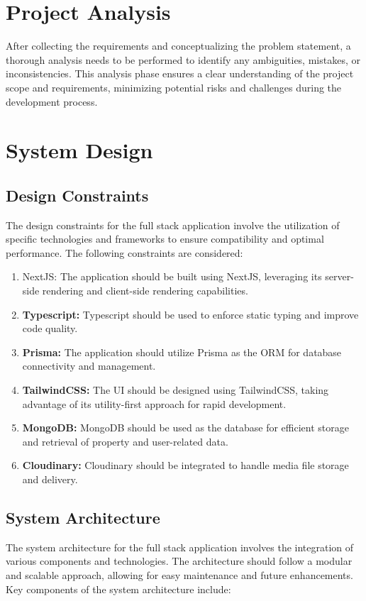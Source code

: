 \section{Project Analysis}
After collecting the requirements and conceptualizing the problem statement, a thorough analysis needs to be performed to identify any ambiguities, mistakes, or inconsistencies. This analysis phase ensures a clear understanding of the project scope and requirements, minimizing potential risks and challenges during the development process.

\section{System Design}
\subsection{Design Constraints}
The design constraints for the full stack application involve the utilization of specific technologies and frameworks to ensure compatibility and optimal performance. The following constraints are considered:
\begin{enumerate}
	\item NextJS: The application should be built using NextJS, leveraging its server-side rendering and client-side rendering capabilities.
	\item \textbf{Typescript:} Typescript should be used to enforce static typing and improve code quality.
	\item \textbf{Prisma:} The application should utilize Prisma as the ORM for database connectivity and management.
	\item \textbf{TailwindCSS:} The UI should be designed using TailwindCSS, taking advantage of its utility-first approach for rapid development.
	\item \textbf{MongoDB:} MongoDB should be used as the database for efficient storage and retrieval of property and user-related data.
	\item \textbf{Cloudinary:} Cloudinary should be integrated to handle media file storage and delivery.
\end{enumerate}

\subsection{System Architecture}
The system architecture for the full stack application involves the integration of various components and technologies. The architecture should follow a modular and scalable approach, allowing for easy maintenance and future enhancements. Key components of the system architecture include:

